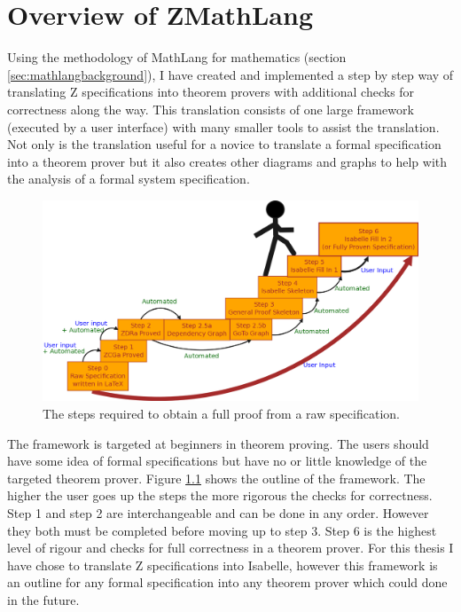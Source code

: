 
\chapter{Overview of ZMathLang}
\label{ch:design}

Using the methodology of MathLang for mathematics (section \ref{sec:mathlangbackground}),
I have created and implemented a step by step way of translating Z
specifications into theorem provers with additional checks for correctness along
the way. This translation consists of one large framework (executed by a user
interface) with many smaller tools to assist the translation. Not only is the
translation useful for a novice to translate a formal specification into a
theorem prover but it also creates other diagrams and graphs to help with the
analysis of a formal system specification.

\begin{figure}[H]
 \begin{center}
 \includegraphics [width=12cm]{Figures/Design/mathlangsteps.png}
 \caption{The steps required to obtain a full proof from a raw specification.}
 \label{fig:steps}
\end{center}
\end{figure} 

The framework is targeted at beginners in theorem proving. The users should have
some idea of formal specifications but have no or little knowledge of the
targeted theorem prover. Figure \ref{fig:steps} shows the outline of the
framework. The higher the user goes up the steps the more rigorous the checks
for correctness. Step 1 and step 2 are interchangeable and can be done in any
order. However they both must be completed before moving up to step 3. Step 6 is
the highest level of rigour and checks for full correctness in a theorem prover.
For this thesis I have chose to translate Z specifications into Isabelle,
however this framework is an outline for any formal specification into any
theorem prover which could done in the future.

